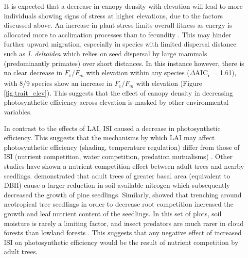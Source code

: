 \documentclass[a4paper, 11pt]{article}
\begin{document}
It is expected that a decrease in canopy density with elevation will lead to more individuals showing signs of stress at higher elevations, due to the factors discussed above. An increase in plant stress limits overall fitness as energy is allocated more to acclimation processes than to fecundity \citep{Reu2011}. This may hinder further upward migration, especially in species with limited dispersal distance such as \textit{I. deltoidea} which relies on seed dispersal by large mammals (predominantly primates) \citep{Russo2005, Kuprewicz2013} over short distances. In this instance however, there is no clear decrease in $F_v/F_m$ with elevation within any species ($\Delta$AIC\textsubscript{r} = 1.61), with 8/9 species show an increase in $F_v/F_m$ with elevation (Figure \ref{fig:trait_elev}). This suggests that the effect of canopy density in decreasing photosynthetic efficiency across elevation is masked by other environmental variables.


In contrast to the effects of LAI, ISI caused a decrease in photosynthetic efficiency. This suggests that the mechanisms by which LAI may affect photosynthetic efficiency (shading, temperature regulation) differ from those of ISI (nutrient competition, water competition, predation mutualisms) \citep{Lewis2000}. Other studies have shown a nutrient competition effect between adult trees and nearby seedlings. \citet{Palik1997} demonstrated that adult trees of greater basal area (equivalent to DBH) cause a larger reduction in soil available nitrogen which subsequently decreased the growth of pine seedlings. Similarly, \citet{Barberis2005} showed that trenching around neotropical tree seedlings in order to decrease root competition increased the growth and leaf nutrient content of the seedlings. In this set of plots, soil moisture is rarely a limiting factor, and insect predators are much rarer in cloud forests than lowland forests \citep{Rodriguez-Castaeda2010}. This suggests that any negative effect of increased ISI on photosynthetic efficiency would be the result of nutrient competition by adult trees.
\end{document}
